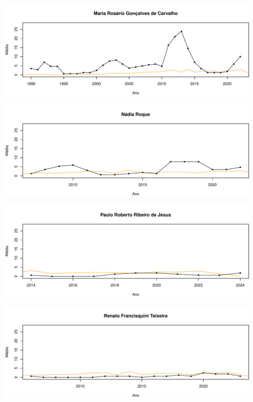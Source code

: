 \documentclass[12pt,brazil]{article}\usepackage[]{graphicx}\usepackage[]{xcolor}
\makeatletter
\def\maxwidth{ %
  \ifdim\Gin@nat@width>\linewidth
    \linewidth
  \else
    \Gin@nat@width
  \fi
}
\makeatother
\begin{document}
\vspace{0.5cm}


{\centering \includegraphics[width=\maxwidth]{figure/mediamovel-34} 

}



\vspace{0.5cm}


{\centering \includegraphics[width=\maxwidth]{figure/mediamovel-35} 

}



\vspace{0.5cm}


{\centering \includegraphics[width=\maxwidth]{figure/mediamovel-36} 

}



\vspace{0.5cm}


{\centering \includegraphics[width=\maxwidth]{figure/mediamovel-37} 

}
\end{document}
